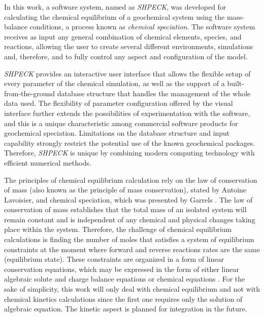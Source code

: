 
In this work, a software system, named as \emph{SHPECK}, was developed for calculating the chemical equilibrium of a geochemical system using the mass-balance conditions, a  process known as \emph{chemical speciation}. The software system receives as input any general combination of chemical elements, species, and reactions, allowing the user to create several different environments, simulations and, therefore, and to fully control any aspect and configuration of the model. 

\emph{SHPECK} provides an interactive user interface that allows the flexible setup of every parameter of the chemical simulation, as well as the support of a built-from-the-ground database structure that handles the management of the whole data used.  The flexibility of parameter configuration offered by the visual interface further extends the possibilities of experimentation with the software, and this is a unique characteristic among commercial software products for geochemical speciation. Limitations on the database structure and input capability strongly restrict the potential use of the known geochemical packages. Therefore, \emph{SHPECK} is unique by combining modern computing technology with efficient numerical methods.


The principles of chemical equilibrium calculation rely on the law of conservation of mass (also known as the principle of mass conservation), stated by Antoine Lavoisier, and chemical speciation, which was presented by Garrels \cite{Garrels:65}. 
The law of conservation of mass establishes that the total mass of an isolated system will remain constant and is independent of any chemical and physical changes taking place within the system. Therefore, the challenge of chemical equilibrium calculations is finding the number of moles that satisfies a system of equilibrium constraints at the moment where forward and reverse reactions rates are the same (equilibrium state). 
These constraints are organized in a form of linear conservation equations, which may be expressed in the form of either linear algebraic solute and charge balance equations or chemical equations \cite{SmithMissen83}. For the sake of simplicity, this work will only deal with chemical equilibrium and not with chemical kinetics calculations since the first one requires only the solution of algebraic equation. The kinetic aspect is planned for integration in the future.


